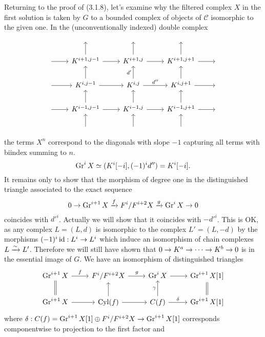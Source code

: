 \documentclass[deligne.tex]{subfiles}
\begin{document}
\restoregeometry
Returning to the proof of (3.1.8), let's examine why the filtered complex
$X$ in the first solution is taken by $G$ to a bounded complex of objects 
of $\mathcal C$ isomorphic to the given one.
In the (unconventionally indexed) double complex
\begin{equation*}\begin{tikzcd}
	&\;&\;&\; \\
	\;\arrow[r]&K^{i+1,j-1}\arrow[u]\arrow[r]
	&K^{i+1,j}\arrow[u]\arrow[r]
	&K^{i+1,j+1}\arrow[u]\arrow[r]&\; \\
	\;\arrow[r]&K^{i,j-1}\arrow[u]\arrow[r]
	&K^{i,j}\arrow[u,"d'"]\arrow[r,"d''"]
	&K^{i,j+1}\arrow[u]\arrow[r]&\; \\
	\;\arrow[r]&K^{i-1,j-1}\arrow[u]\arrow[r]
	&K^{i-1,j}\arrow[u]\arrow[r]
	&K^{i-1,j+1}\arrow[u]\arrow[r]&\; \\
	&\;\arrow[u]&\;\arrow[u]&\;\arrow[u]
\end{tikzcd}\end{equation*}
the terms $X^n$ correspond to the diagonals with
slope $-1$ capturing all terms with biindex summing to $n$.
\begin{equation*}
	\operatorname{Gr}^iX\simeq(K^i[-i],(-1)^id'')=K^i[-i].
\end{equation*}
It remains only to show that the morphism of degree one in the 
distinguished triangle associated to the exact sequence
\begin{equation*}
	0\rightarrow\operatorname{Gr}^{i+1}X\xrightarrow f F^i/F^{i+2}X\xrightarrow g\operatorname{Gr}^iX\rightarrow0
\end{equation*}
coincides with $d'^i$. Actually we will show that it coincides with
$-d'^i$. This is OK, as any complex $L=(L,d)$ is isomorphic to the
complex $L'=(L,-d)$ by the morphisms $(-1)^i\operatorname{id}:L^i\rightarrow L^i$ which induce an
isomorphism of chain complexes $L\xrightarrow\sim L'$.
Therefore we will still have shown that $0\rightarrow K^a\rightarrow\cdots\rightarrow K^b\rightarrow0$ is
in the essential image of $G$.
We have an isomorphism of distinguished triangles
\begin{equation*}\begin{tikzcd}
	\Gr^{i+1}X\arrow[r,"f"]
	&F^i/F^{i+2}X\arrow[r,"g"]
	&\Gr^iX\arrow[r]
	&\Gr^{i+1}X[1] \\
	\Gr^{i+1}X\arrow[r]\arrow[u,equals]
	&\operatorname{Cyl}(f)\arrow[u]\arrow[r]
	&C(f)\arrow[u,"\gamma"]\arrow[r,"\delta"]
	&\Gr^{i+1}X[1]\arrow[u,equals]
\end{tikzcd}\end{equation*}
where $\delta:C(f)=\operatorname{Gr}^{i+1}X[1]\oplus F^i/F^{i+2}X\rightarrow \operatorname{Gr}^{i+1}X[1]$
corresponds componentwise to projection to the first factor and
\end{document}
